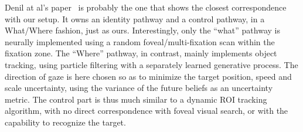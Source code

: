 Denil at al's paper~\cite{denil2012learning} is probably the one that shows the closest correspondence with our setup. It owns an identity pathway and a control pathway, in a What/Where fashion, just as ours. Interestingly, only the ``what'' pathway is neurally implemented using a random foveal/multi-fixation scan within the fixation zone. The ``Where'' pathway, in contrast, mainly implements object tracking, using  particle filtering with a separately learned generative process. The direction of gaze is here chosen so as to minimize the target position, speed and scale uncertainty, using the variance of the future beliefs as an uncertainty metric. The control part is thus much similar to a dynamic ROI tracking algorithm, with no direct correspondence with foveal visual search, or with the capability to recognize the target.
